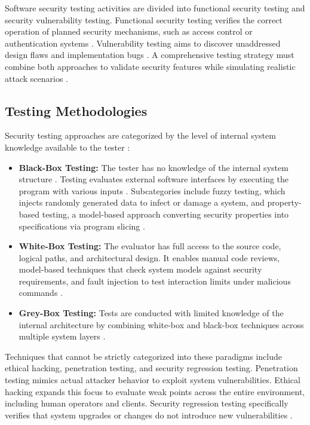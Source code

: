 Software security testing activities are divided into functional security testing and security vulnerability testing. Functional security testing verifies the correct operation of planned security mechanisms, such as access control or authentication systems \cite[p. 82]{1341418} \cite[p. 8]{richier2011security}. Vulnerability testing aims to discover unaddressed design flaws and implementation bugs \cite[p. 8]{richier2011security}. A comprehensive testing strategy must combine both approaches to validate security features while simulating realistic attack scenarios \cite[p. 81 f]{1341418}.

\subsection{Testing Methodologies}
\label{subsec:testing_taxonomy}

Security testing approaches are categorized by the level of internal system knowledge available to the tester \cite[p. 296]{tauqeer2021analysis}:

\begin{itemize}
	\item \textbf{Black-Box Testing:} The tester has no knowledge of the internal system structure \cite[p. 296]{tauqeer2021analysis}. Testing evaluates external software interfaces by executing the program with various inputs \cite[p. 82]{1341418}. Subcategories include fuzzy testing, which injects randomly generated data to infect or damage a system, and property-based testing, a model-based approach converting security properties into specifications via program slicing \cite[p. 296]{tauqeer2021analysis}.
	
	\item \textbf{White-Box Testing:} The evaluator has full access to the source code, logical paths, and architectural design. It enables manual code reviews, model-based techniques that check system models against security requirements, and fault injection to test interaction limits under malicious commands \cite[p. 296]{tauqeer2021analysis}.
	
	\item \textbf{Grey-Box Testing:} Tests are conducted with limited knowledge of the internal architecture by combining white-box and black-box techniques across multiple system layers \cite[p. 296]{tauqeer2021analysis}.
\end{itemize}

Techniques that cannot be strictly categorized into these paradigms include ethical hacking, penetration testing, and security regression testing. Penetration testing mimics actual attacker behavior to exploit system vulnerabilities. Ethical hacking expands this focus to evaluate weak points across the entire environment, including human operators and clients. Security regression testing specifically verifies that system upgrades or changes do not introduce new vulnerabilities \cite[p. 296]{tauqeer2021analysis}.


